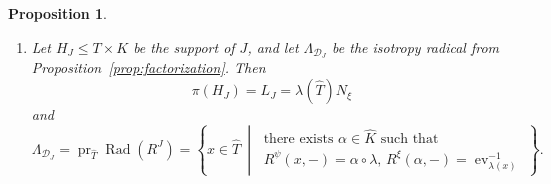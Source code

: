 \documentclass{amsart}
\newtheorem{proposition}[theorem]{Proposition}
\theoremstyle{definition}
\newcommand{\Rad}{\operatorname{Rad}}
\numberwithin{equation}{section}
\begin{document}
\begin{proposition}
\begin{enumerate}
\item Let $H_J\leq T\times K$ be the support of $J$, and let
$\Lambda_{\mathcal D_J}$ be the isotropy radical from
Proposition~\ref{prop:factorization}.  Then
\begin{equation}\label{eq:dictionary-support}
 \pi(H_J)=L_J=\lambda(\widehat T)N_\xi
\end{equation}
and
\begin{equation}\label{eq:dictionary-isotropy-radical}
 \Lambda_{\mathcal D_J}
 =\operatorname{pr}_{\widehat T}\Rad(R^J)
 =
 \left\{
 x\in \widehat T\ \middle|\
 \begin{array}{l}
 \text{there exists }\alpha\in \widehat K\text{ such that}\\[1mm]
 R^\psi(x,-)=\alpha\circ\lambda,\,
 R^\xi(\alpha,-)=\operatorname{ev}_{\lambda(x)}^{-1}
 \end{array}
 \right\}.
\end{equation}

\end{enumerate}
\end{proposition}
\end{document}
